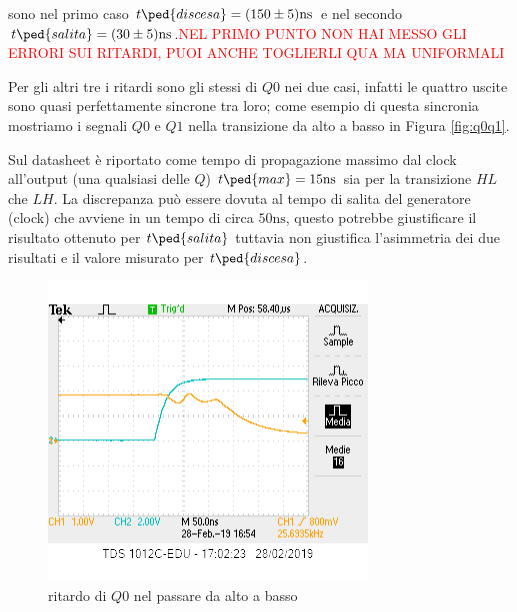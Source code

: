 \documentclass[10pt,a4paper]{article}
\begin{document}
sono nel primo caso $t\ped{discesa} = (150 \pm 5)\si{\nano\second}$ e nel secondo  $t\ped{salita} = (30 \pm 5)\si{\nano\second}$.\textcolor{red}{NEL PRIMO PUNTO NON HAI MESSO GLI ERRORI SUI RITARDI, PUOI ANCHE TOGLIERLI QUA MA UNIFORMALI}

Per gli altri tre i ritardi sono gli stessi di $Q0$  nei due casi, infatti le quattro uscite sono quasi perfettamente sincrone tra loro; come esempio  di questa sincronia mostriamo  i segnali $Q0$ e $Q1$ nella transizione da alto a basso in Figura \ref{fig:q0q1}.

Sul datasheet è riportato come tempo di propagazione massimo dal clock all'output (una qualsiasi delle $Q$) $t\ped{max} = 15\si{\nano\second}$ sia per la transizione $HL$ che $LH$. La discrepanza può essere dovuta al tempo di salita del generatore (clock) che avviene in un tempo di circa $50 \si{\nano\second}$, questo potrebbe giustificare il risultato ottenuto per $t\ped{salita} $ tuttavia non giustifica l'asimmetria dei due risultati e il valore misurato per $t\ped{discesa}$.



\begin{figure}[h]

			\centering

			\includegraphics[scale=0.85]{tcounter}

			\caption{ritardo di $Q0$ nel passare da alto a basso}

			\label{fig:t1}

\end{figure}
\end{document}
